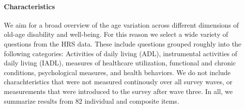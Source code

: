 \documentclass{article}
\begin{document}



\paragraph*{Characteristics}
We aim for a broad overview of the age variation across different dimensions of
old-age disability and well-being. For this reason we select a wide variety of
questions from the HRS data. These include questions
grouped roughly into the following categories: Activities of daily living (ADL),
instrumental activities of daily living (IADL), measures of healthcare utilization, functional and chronic conditions, psychological
measures, and health behaviors. We do not include charachteristics that were
not measured continously over all survey waves, or measurements that were
introduced to the survey after wave three. In all, we summarize results from 82
individual and composite items. 
\end{document}

